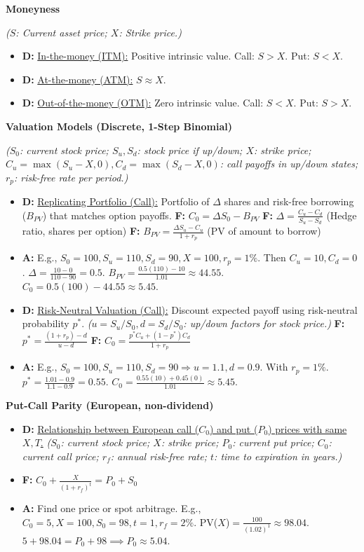 \documentclass[7pt,landscape]{extarticle} %
\newcommand{\cheatsheetsubsubsection}[1]{%
  \vspace{0.15ex plus 0.05ex minus 0.05ex}%
  \noindent\textbf{\sffamily\scriptsize #1}%
  \par\vspace{0.05ex}%
}
\newcommand{\D}[1]{\textbf{\textcolor{DefColor}{D:}} \uline{#1}}
\newcommand{\F}[1]{\textbf{\textcolor{FormColor}{F:}} #1}
\newcommand{\A}[1]{\textbf{\textcolor{AppColor}{A:}} #1}
\newcommand{\SF}[1]{\textit{\small (#1)}} %
\begin{document}
\begin{multicols*}{4}
  \cheatsheetsubsubsection{Moneyness}
  \SF{$S$: Current asset price; $X$: Strike price.}
  \begin{itemize}
    \item \D{In-the-money (ITM):} Positive intrinsic value. Call: $S>X$. Put: $S<X$.
    \item \D{At-the-money (ATM):} $S \approx X$.
    \item \D{Out-of-the-money (OTM):} Zero intrinsic value. Call: $S<X$. Put: $S>X$.
  \end{itemize}
  
  \cheatsheetsubsubsection{Valuation Models (Discrete, 1-Step Binomial)}
  \SF{$S_0$: current stock price; $S_u, S_d$: stock price if up/down; $X$: strike price; $C_u = \max(S_u-X,0), C_d = \max(S_d-X,0)$: call payoffs in up/down states; $r_p$: risk-free rate per period.}
  \begin{itemize}
    \item \D{Replicating Portfolio (Call):} Portfolio of $\Delta$ shares and risk-free borrowing ($B_{PV}$) that matches option payoffs.
          \F{$C_0 = \Delta S_0 - B_{PV}$}
          \F{$\Delta = \frac{C_u - C_d}{S_u - S_d}$} (Hedge ratio, shares per option)
          \F{$B_{PV} = \frac{\Delta S_u - C_u}{1+r_p}$} (PV of amount to borrow)
    \item \A{E.g., $S_0=100, S_u=110, S_d=90, X=100, r_p=1\%$. Then $C_u=10, C_d=0$. $\Delta=\frac{10-0}{110-90}=0.5$. $B_{PV}=\frac{0.5(110)-10}{1.01} \approx 44.55$. $C_0=0.5(100)-44.55 \approx 5.45$.}
    \item \D{Risk-Neutral Valuation (Call):} Discount expected payoff using risk-neutral probability $p^*$.
          \SF{$u=S_u/S_0, d=S_d/S_0$: up/down factors for stock price.}
          \F{$p^* = \frac{(1+r_p) - d}{u-d}$}
          \F{$C_0 = \frac{p^*C_u + (1-p^*)C_d}{1+r_p}$}
    \item \A{E.g., $S_0=100, S_u=110, S_d=90 \Rightarrow u=1.1, d=0.9$. With $r_p=1\%$. $p^*=\frac{1.01-0.9}{1.1-0.9}=0.55$. $C_0=\frac{0.55(10)+0.45(0)}{1.01} \approx 5.45$.}
  \end{itemize}
  
  \cheatsheetsubsubsection{Put-Call Parity (European, non-dividend)}
  \begin{itemize}
    \item \D{Relationship between European call ($C_0$) and put ($P_0$) prices with same $X, T$.}
          \SF{$S_0$: current stock price; $X$: strike price; $P_0$: current put price; $C_0$: current call price; $r_f$: annual risk-free rate; $t$: time to expiration in years.}
    \item \F{$C_0 + \frac{X}{(1+r_f)^t} = P_0 + S_0$}
    \item \A{Find one price or spot arbitrage. E.g., $C_0=5, X=100, S_0=98, t=1, r_f=2\%$. PV($X$)$=\frac{100}{(1.02)^1} \approx 98.04$. $5+98.04=P_0+98 \implies P_0 \approx 5.04$.}
  \end{itemize}
  

\end{multicols*}
\end{document}
